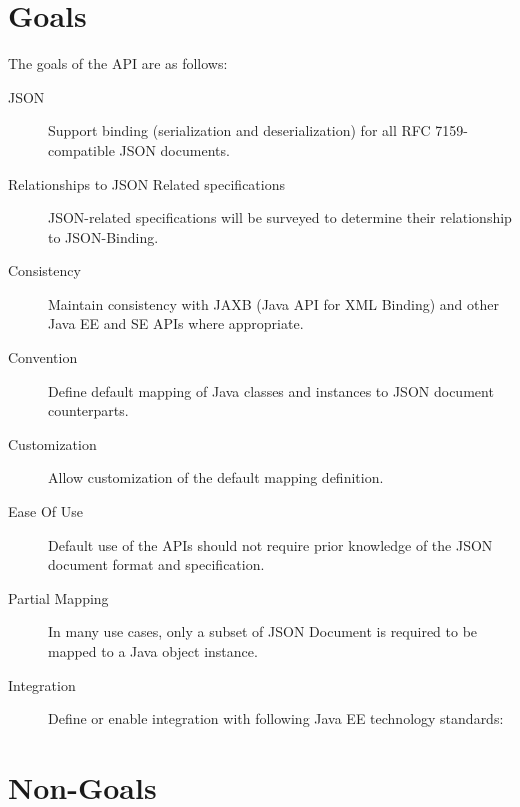 \section{Goals}

The goals of the API are as follows:

\begin{description}

\item[JSON] 
Support binding (serialization and deserialization) for all RFC 7159-compatible JSON documents.

\item [Relationships to JSON Related specifications]
JSON-related specifications will be surveyed to determine their relationship to JSON-Binding.

\item[Consistency] 
Maintain consistency with JAXB (Java API for XML Binding) and other Java EE and SE APIs where appropriate.

\item[Convention] 
Define default mapping of Java classes and instances to JSON document counterparts.

\item[Customization] 
Allow customization of the default mapping definition.

\item[Ease Of Use] 
Default use of the APIs should not require prior knowledge of the JSON document format and specification.

\item[Partial Mapping] 
In many use cases, only a subset of JSON Document is required to be mapped to a Java object instance.

\item[Integration]
Define or enable integration with following Java EE technology standards:
  
\end{description}

\section{Non-Goals}
\label{non_goals}

